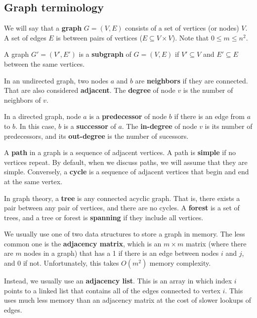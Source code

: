 \documentclass[titlepage, 12pt, leqno]{article}
\begin{document}
\subsection{Graph terminology}
We will say that a \textbf{graph} $G = (V,E)$ consists of a set of vertices 
(or nodes) $V$. A set of edges $E$ is between pairs of vertices 
($E \subseteq V\times V$). Note that $0\le m \le n^{2}$.

A graph $G' = (V', E')$ is a \textbf{subgraph} of $G = (V,E)$ if
$V' \subseteq V$ and $E' \subseteq E$ between the same vertices.

In an undirected graph, two nodes $a$ and $b$ are \textbf{neighbors} if they
are connected. That are also considered \textbf{adjacent}. The \textbf{degree}
of node $v$ is the number of neighbors of $v$.

In a directed graph, node $a$ is a \textbf{predecessor} of node $b$ if there is
an edge from $a$ to $b$. In this case, $b$ is a \textbf{successor} of $a$.
The \textbf{in-degree} of node $v$ is its number of predecessors, and its
\textbf{out-degree} is the number of sucessors.

A \textbf{path} in a graph is a sequence of adjacent vertices. A path is
\textbf{simple} if no vertices repeat. By default, when we discuss paths, we will
assume that they are simple. Conversely, a \textbf{cycle} is a sequence of 
adjacent vertices that begin and end at the same vertex.

In graph theory, a \textbf{tree} is any connected acyclic graph. That is,
there exists a pair between any pair of vertices, and there are no cycles. A
\textbf{forest} is a set of trees, and a tree or forest is \textbf{spanning} if
they include all vertices.

We usually use one of two data structures to store a graph in memory. The less
common one is the \textbf{adjacency matrix}, which is an $m\times m$ matrix
(where there are $m$ nodes in a graph) that has a 1 if there is an edge between
nodes $i$ and $j$, and 0 if not. Unfortunately, this takes $O(m^{2})$ memory
complexity.

Instead, we usually use an \textbf{adjacency list}. This is an array in which
index $i$ points to a linked list that contains all of the edges connected to
vertex $i$. This uses much less memory than an adjacency matrix at the cost of
slower lookups of edges.
\end{document}
